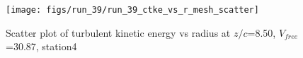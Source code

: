 \begin{figure}[H]
\centering
\texttt{[image: figs/run\_39/run\_39\_ctke\_vs\_r\_mesh\_scatter]}
\caption{Scatter plot of turbulent kinetic energy vs radius at $z/c$=8.50, $V_{free}$=30.87, station4}
\label{fig:run_39_ctke_vs_r_mesh_scatter}
\end{figure}


